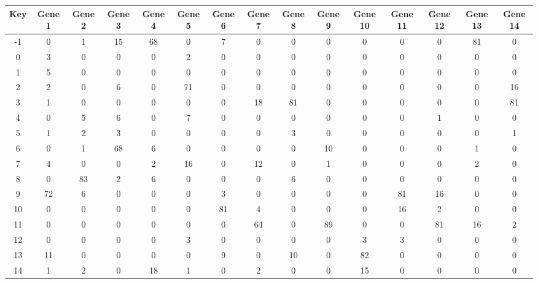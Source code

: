 \begin{tabular}{|c|c|c|c|c|c|c|c|c|c|c|c|c|c|c|}
\hline
Key & Gene 1 & Gene 2 & Gene 3 & Gene 4 & Gene 5 & Gene 6 & Gene 7 & Gene 8 & Gene 9 & Gene 10 & Gene 11 & Gene 12 & Gene 13 & Gene 14 \\
\hline
-1 & 0 & 1 & 15 & 68 & 0 & 7 & 0 & 0 & 0 & 0 & 0 & 0 & 81 & 0 \\
0 & 3 & 0 & 0 & 0 & 2 & 0 & 0 & 0 & 0 & 0 & 0 & 0 & 0 & 0 \\
1 & 5 & 0 & 0 & 0 & 0 & 0 & 0 & 0 & 0 & 0 & 0 & 0 & 0 & 0 \\
2 & 2 & 0 & 6 & 0 & 71 & 0 & 0 & 0 & 0 & 0 & 0 & 0 & 0 & 16 \\
3 & 1 & 0 & 0 & 0 & 0 & 0 & 18 & 81 & 0 & 0 & 0 & 0 & 0 & 81 \\
4 & 0 & 5 & 6 & 0 & 7 & 0 & 0 & 0 & 0 & 0 & 0 & 1 & 0 & 0 \\
5 & 1 & 2 & 3 & 0 & 0 & 0 & 0 & 3 & 0 & 0 & 0 & 0 & 0 & 1 \\
6 & 0 & 1 & 68 & 6 & 0 & 0 & 0 & 0 & 10 & 0 & 0 & 0 & 1 & 0 \\
7 & 4 & 0 & 0 & 2 & 16 & 0 & 12 & 0 & 1 & 0 & 0 & 0 & 2 & 0 \\
8 & 0 & 83 & 2 & 6 & 0 & 0 & 0 & 6 & 0 & 0 & 0 & 0 & 0 & 0 \\
9 & 72 & 6 & 0 & 0 & 0 & 3 & 0 & 0 & 0 & 0 & 81 & 16 & 0 & 0 \\
10 & 0 & 0 & 0 & 0 & 0 & 81 & 4 & 0 & 0 & 0 & 16 & 2 & 0 & 0 \\
11 & 0 & 0 & 0 & 0 & 0 & 0 & 64 & 0 & 89 & 0 & 0 & 81 & 16 & 2 \\
12 & 0 & 0 & 0 & 0 & 3 & 0 & 0 & 0 & 0 & 3 & 3 & 0 & 0 & 0 \\
13 & 11 & 0 & 0 & 0 & 0 & 9 & 0 & 10 & 0 & 82 & 0 & 0 & 0 & 0 \\
14 & 1 & 2 & 0 & 18 & 1 & 0 & 2 & 0 & 0 & 15 & 0 & 0 & 0 & 0 \\
\hline
\end{tabular}